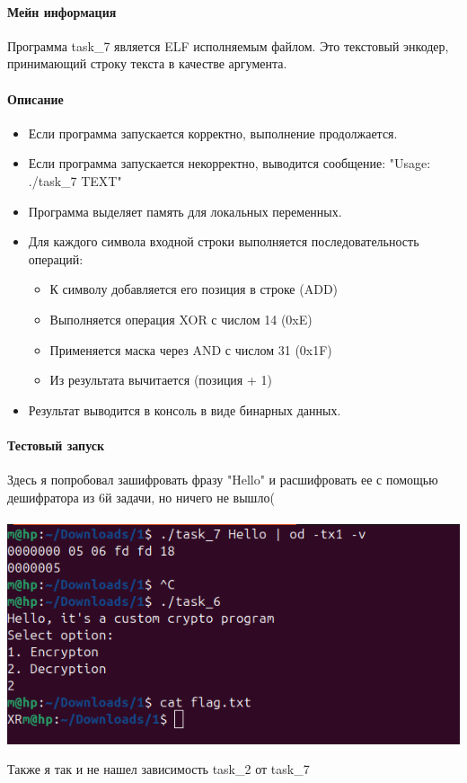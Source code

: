 \paragraph{Мейн информация}
Программа task\_7 является ELF исполняемым файлом.
Это текстовый энкодер, принимающий строку текста в качестве аргумента.

\paragraph{Описание}

\begin{itemize}
    \item Если программа запускается корректно, выполнение продолжается.
    \item Если программа запускается некорректно, выводится сообщение: "Usage: ./task\_7 TEXT"
    \item Программа выделяет память для локальных переменных.
    \item Для каждого символа входной строки выполняется последовательность операций:
    \begin{itemize}
        \item К символу добавляется его позиция в строке (ADD)
        \item Выполняется операция XOR с числом 14 (0xE)
        \item Применяется маска через AND с числом 31 (0x1F)
        \item Из результата вычитается (позиция + 1)
    \end{itemize}
    \item Результат выводится в консоль в виде бинарных данных.
\end{itemize}

\paragraph{Тестовый запуск}
Здесь я попробовал зашифровать фразу "Hello" и расшифровать ее с помощью дешифратора из 6й задачи, но ничего
не вышло(

\paragraph{}
\includegraphics[width=1\linewidth]{static/_task_7}

Также я так и не нашел зависимость task\_2 от task\_7

